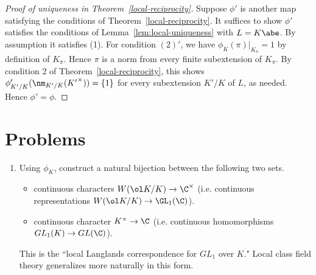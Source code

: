 \begin{proof}[Proof of uniqueness in Theorem~\ref{local-reciprocity}]
Suppose $\phi'$ is another map satisfying the conditions of Theorem~\ref{local-reciprocity}. It suffices to show $\phi'$ satisfies the conditions of Lemma~\ref{lem:local-uniqueness} with $L=K\abe$. By assumption it satisfies (1). For condition $(2)'$, we have $\phi_{K}(\pi)|_{K_{\pi}}=1$ by definition of $K_{\pi}$. Hence $\pi$ is a norm from every finite subextension of $K_{\pi}$. By condition 2 of Theorem~\ref{local-reciprocity}, this shows $\phi'_{K'/K}(\nm_{K'/K}({K'}^{\times}))=\{1\}$ for every subextension $K'/K$ of $L$, as needed. Hence $\phi'=\phi$.
\end{proof}
\section*{Problems}
\begin{enumerate}
\item
Using $\phi_K$, construct a natural bijection between the following two sets.
\begin{itemize}
\item
continuous characters $W(\ol K/K)\to \C^{\times}$ (i.e. continuous representations $W(\ol K/K)\to \GL_1(\C)$).
\item
continuous character $K^{\times}\to \C$ (i.e. continuous homomorphisms $GL_1(K)\to GL(\C)$).
\end{itemize}
This is the ``local Langlands correspondence for $GL_1$ over $K$." Local class field theory generalizes more naturally in this form.
\end{enumerate}
